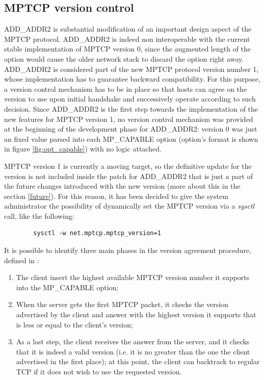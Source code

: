 \subsection{MPTCP version control}
\label{retrocomp}
ADD\_ADDR2 is substantial modification of an important design aspect of the MPTCP protocol. ADD\_ADDR2 is indeed non interoperable with the current stable implementation of MPTCP version 0, since the augmented length of the option would cause the older network stack to discard the option right away.
ADD\_ADDR2 is considered part of the new MPTCP protocol version number 1, whose implementation has to guarantee backward compatibility. For this purpose, a version control mechanism has to be in place so that hosts can agree on the version to use upon initial handshake and successively operate according to such decision. Since ADD\_ADDR2 is the first step towards the implementation of the new features for MPTCP version 1, no version control mechanism was provided at the beginning of the development phase for ADD\_ADDR2: version 0 was just an fixed value parsed into each MP\_CAPABLE option (option's format is shown in figure \ref{fig:opt_capable}) with no logic attached.

MPTCP version 1 is currently a moving target, so the definitive update for the version is not included inside the patch for ADD\_ADDR2 that is just a part of the future changes introduced with the new version (more about this in the section \ref{future}). For this reason, it has been decided to give the system administrator the possibility of dynamically set the MPTCP version via a \textit{sysctl} call, like the following:

\begin{verbatim}
        sysctl -w net.mptcp.mptcp_version=1
\end{verbatim}

It is possible to identify three main phases in the version agreement procedure, defined in :

\begin{enumerate}
  \item The client insert the highest available MPTCP version number it supports into the MP\_CAPABLE option;
  \item When the server gets the first MPTCP packet, it checks the version advertised by the client and answer with the highest version it supports that is less or equal to the client's version;
  \item As a last step, the client receives the answer from the server, and it checks that it is indeed a valid version (i.e. it is no greater than the one the client advertised in the first place); at this point, the client can backtrack to regular TCP if it does not wish to use the requested version.
\end{enumerate}

